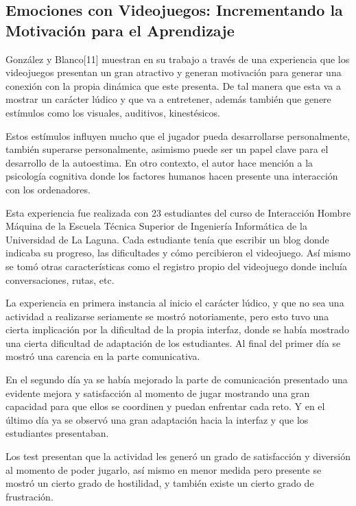 \documentclass[conference, letterpaper]{IEEEtran}
\begin{document}
\subsection{Emociones con Videojuegos: Incrementando la Motivación para el Aprendizaje }
González y Blanco[11] muestran en su trabajo a través de una experiencia que los videojuegos presentan un gran atractivo y 
generan motivación para generar una conexión con la propia dinámica que este presenta. De tal manera que esta va a mostrar un 
carácter lúdico y que va a entretener, además también que genere estímulos como los visuales, auditivos, kinestésicos.  

Estos estímulos influyen mucho que el jugador pueda desarrollarse personalmente, también superarse personalmente, asimismo puede ser un papel clave para el desarrollo de la autoestima. En otro contexto, el autor hace mención a la psicología cognitiva donde los factores humanos hacen presente una interacción con los ordenadores.
 
Esta experiencia fue realizada con 23 estudiantes del curso de Interacción Hombre Máquina de la Escuela Técnica Superior de Ingeniería Informática de la Universidad de La Laguna. Cada estudiante tenía que escribir un blog donde indicaba su progreso, las dificultades y cómo percibieron el videojuego. Así mismo se tomó otras características como el registro propio del videojuego donde incluía conversaciones, rutas, etc. 

La experiencia en primera instancia al inicio el carácter lúdico, y que no sea una actividad a realizarse seriamente se mostró notoriamente, pero esto tuvo una cierta implicación por la dificultad de la propia interfaz, donde se había mostrado una cierta dificultad de adaptación de los estudiantes. Al final del primer día se mostró una carencia en la parte comunicativa.

En el segundo día ya se había mejorado la parte de comunicación presentado una evidente mejora y satisfacción al momento de jugar mostrando una gran capacidad para que ellos se coordinen y puedan enfrentar cada reto. Y en el último día ya se observó una gran adaptación hacia la interfaz y que los estudiantes presentaban.

Los test presentan que la actividad les generó un grado de satisfacción y diversión al momento de poder jugarlo, así mismo en menor medida pero presente se mostró un cierto grado de hostilidad, y también existe un cierto grado de frustración. 
\end{document}

